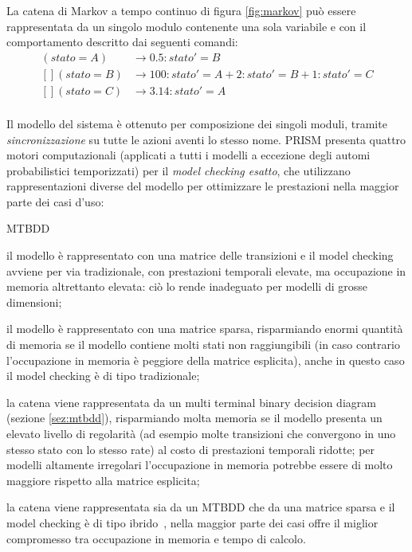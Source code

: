 		La catena di Markov a tempo continuo di figura \ref{fig:markov} pu\`o essere rappresentata da un singolo modulo contenente una sola variabile e con il comportamento descritto dai seguenti comandi:
		\begin{align*}
			[] (stato = A) &\rightarrow 0.5 : stato' = B\\
			[] (stato = B) &\rightarrow 100 : stato' = A + 2 : stato' = B + 1 : stato' = C\\
			[] (stato = C) &\rightarrow 3.14 : stato' = A\\
		\end{align*}		
		
		Il modello del sistema \`e ottenuto per composizione dei singoli moduli, tramite \emph{sincronizzazione} su tutte le azioni aventi lo stesso nome.
		PRISM presenta quattro motori computazionali (applicati a tutti i modelli a eccezione degli automi probabilistici temporizzati) per il \emph{model checking esatto}, che utilizzano rappresentazioni diverse del modello per ottimizzare le prestazioni nella maggior parte dei casi d'uso:
		\begin{labeling}{MTBDD}
			\item [explicit] il modello \`e rappresentato con una matrice delle transizioni e il model checking avviene per via tradizionale, con prestazioni temporali elevate, ma occupazione in memoria altrettanto elevata: ci\`o lo rende inadeguato per modelli di grosse dimensioni;
			\item [sparse] il modello \`e rappresentato con una matrice sparsa, risparmiando enormi quantit\`a di memoria se il modello contiene molti stati non raggiungibili (in caso contrario l'occupazione in memoria \`e peggiore della matrice esplicita), anche in questo caso il model checking \`e di tipo tradizionale;
			\item [MTBDD] la catena viene rappresentata da un multi terminal binary decision diagram (sezione \ref{sez:mtbdd}), risparmiando molta memoria se il modello presenta un elevato livello di regolarit\`a (ad esempio molte transizioni che convergono in uno stesso stato con lo stesso rate) al costo di prestazioni temporali ridotte; per modelli altamente irregolari l'occupazione in memoria potrebbe essere di molto maggiore rispetto alla matrice esplicita;
			\item [hybrid] la catena viene rappresentata sia da un MTBDD che da una matrice sparsa e il model checking \`e di tipo ibrido~\cite{kwiatkowska2004probabilistic}, nella maggior parte dei casi offre il miglior compromesso tra occupazione in memoria e tempo di calcolo.
		\end{labeling}
		
